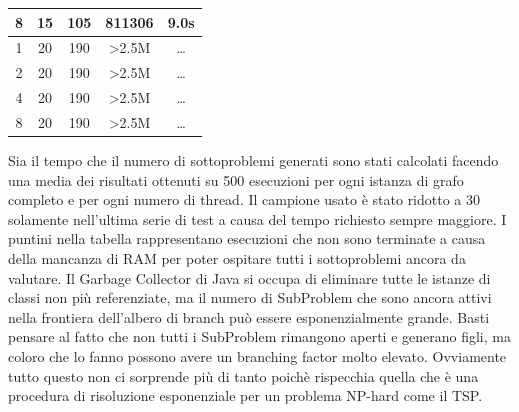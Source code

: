 \documentclass[
    article,            %
    12pt,                %
    oneside,            %
    a4paper,            %
    english,            %
    italian,                %
    sumario=tradicional,
]{abntex2}
\begin{document}
\begin{center}
\begin{tabular}{||c c c c c||}
            8      & 15       & 105      & 811306           & 9.0s                     \\
            \hline
            \hline
            1      & 20       & 190      & >2.5M            & \ldots                      \\
            \hline
            2      & 20       & 190      & >2.5M            & \ldots                      \\
            \hline
            4      & 20       & 190      & >2.5M            & \ldots                      \\
            \hline
            8      & 20       & 190      & >2.5M            & \ldots                      \\
            \hline
        \end{tabular}
    \end{center}
    Sia il tempo che il numero di sottoproblemi generati sono stati calcolati facendo una media dei risultati ottenuti su 500 esecuzioni per ogni istanza di grafo completo e per ogni numero di thread.
    Il campione usato è stato ridotto a 30 solamente nell'ultima serie di test a causa del tempo richiesto sempre maggiore.
    I puntini nella tabella rappresentano esecuzioni che non sono terminate a causa della mancanza di RAM per poter ospitare tutti i sottoproblemi ancora da valutare.
    Il {\selectfont Garbage Collector} di Java si occupa di eliminare tutte le istanze di classi non più referenziate, ma il numero di {\selectfont SubProblem} che sono ancora attivi nella frontiera dell'albero di branch può essere esponenzialmente grande.
    Basti pensare al fatto che non tutti i {\selectfont SubProblem} rimangono aperti e generano figli, ma coloro che lo fanno possono avere un branching factor molto elevato.\newline
    Ovviamente tutto questo non ci sorprende più di tanto poichè rispecchia quella che è una procedura di risoluzione esponenziale per un problema NP-hard come il TSP.
\end{document}

